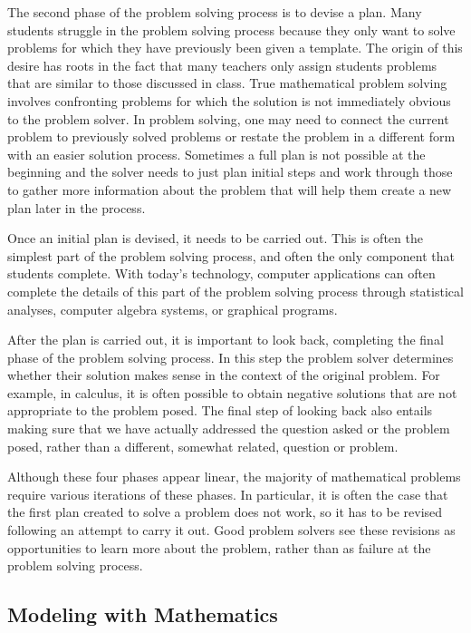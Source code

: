 \documentclass[
]{book}
\theoremstyle{definition}
\theoremstyle{definition}
\theoremstyle{definition}
\theoremstyle{definition}
\theoremstyle{remark}
\begin{document}
The second phase of the problem solving process is to devise a plan. Many students struggle in the problem solving process because they only want to solve problems for which they have previously been given a template. The origin of this desire has roots in the fact that many teachers only assign students problems that are similar to those discussed in class. True mathematical problem solving involves confronting problems for which the solution is not immediately obvious to the problem solver. In problem solving, one may need to connect the current problem to previously solved problems or restate the problem in a different form with an easier solution process. Sometimes a full plan is not possible at the beginning and the solver needs to just plan initial steps and work through those to gather more information about the problem that will help them create a new plan later in the process.

Once an initial plan is devised, it needs to be carried out. This is often the simplest part of the problem solving process, and often the only component that students complete. With today's technology, computer applications can often complete the details of this part of the problem solving process through statistical analyses, computer algebra systems, or graphical programs.

After the plan is carried out, it is important to look back, completing the final phase of the problem solving process. In this step the problem solver determines whether their solution makes sense in the context of the original problem. For example, in calculus, it is often possible to obtain negative solutions that are not appropriate to the problem posed. The final step of looking back also entails making sure that we have actually addressed the question asked or the problem posed, rather than a different, somewhat related, question or problem.

Although these four phases appear linear, the majority of mathematical problems require various iterations of these phases. In particular, it is often the case that the first plan created to solve a problem does not work, so it has to be revised following an attempt to carry it out. Good problem solvers see these revisions as opportunities to learn more about the problem, rather than as failure at the problem solving process.

\hypertarget{modeling-with-mathematics}{%
\subsection{Modeling with Mathematics}\label{modeling-with-mathematics}}
\end{document}
